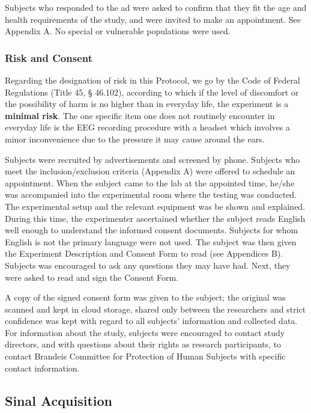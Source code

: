 \documentclass[journal]{IEEEtran}
\begin{document}
\vspace{5mm}
\normalsize Subjects who responded to the ad were asked to confirm that they fit the age and health requirements of the study, and were invited to make an appointment. See Appendix A. No special or vulnerable populations were used.

\subsubsection{Risk and Consent}
Regarding the designation of risk in this Protocol, we go by the Code of Federal Regulations (Title 45, § 46.102), according to which if the level of discomfort or the possibility of harm is no higher than in everyday life, the experiment is a \textbf{minimal risk}. The one specific item one does not routinely encounter in everyday life is the EEG recording procedure with a headset which involves a minor inconvenience due to the pressure it may cause around the ears. \par
Subjects were recruited by advertisements and screened by phone. Subjects who meet the inclusion/exclusion criteria (Appendix A) were offered to schedule an appointment. When the subject came to the lab at the appointed time, he/she was accompanied into the experimental room where the testing was conducted. The experimental setup and the relevant equipment was be shown and explained. During this time, the experimenter ascertained whether the subject reads English well enough to understand the informed consent documents. Subjects for whom English is not the primary language were not used. The subject was then given the Experiment Description and Consent Form to read (see Appendices B). Subjects was encouraged to ask any questions they may have had.  Next, they were asked to read and sign the Consent Form. \par  A copy of the signed consent form was given to the subject; the original was scanned and kept in cloud storage, shared only between the researchers and strict confidence was kept with regard to all subjects’ information and collected data.
For information about the study, subjects were encouraged to contact study directors, and with questions about their rights as research participants, to contact Brandeis Committee for Protection of Human Subjects with specific contact information.   

\subsection{Sinal Acquisition}
\end{document}
